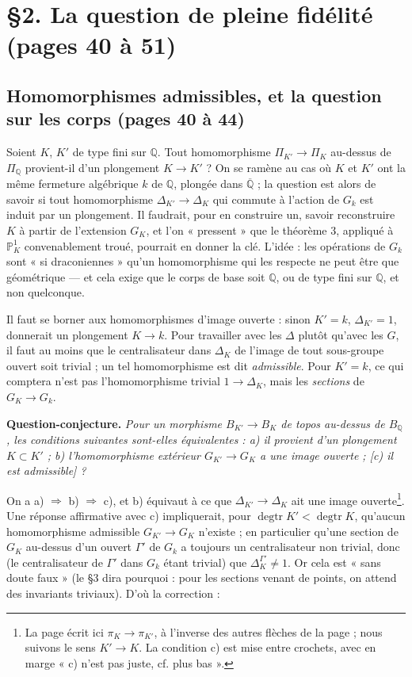 \documentclass[11pt,a4paper]{article}
\begin{document}
\section*{§2. La question de pleine fidélité (pages 40 à 51)}

\subsection*{Homomorphismes admissibles, et la question sur les corps (pages 40 à 44)}

Soient $K$, $K'$ de type fini sur $\mathbb{Q}$. Tout homomorphisme
$\Pi_{K'} \to \Pi_K$ au-dessus de $\Pi_{\mathbb{Q}}$ provient-il d'un
plongement $K \to K'$ ? On se ramène au cas où $K$ et $K'$ ont la même
fermeture algébrique $k$ de $\mathbb{Q}$, plongée dans
$\overline{\mathbb{Q}}$ ; la question est alors de savoir si tout
homomorphisme $\Delta_{K'} \to \Delta_K$ qui commute à l'action de $G_k$ est
induit par un plongement. Il faudrait, pour en construire un, savoir
reconstruire $K$ à partir de l'extension $G_K$, et l'on « pressent » que le
théorème 3, appliqué à $\mathbb{P}^1_K$ convenablement troué, pourrait en
donner la clé. L'idée : les opérations de $G_k$ sont « si draconiennes »
qu'un homomorphisme qui les respecte ne peut être que géométrique — et cela
exige que le corps de base soit $\mathbb{Q}$, ou de type fini sur
$\mathbb{Q}$, et non quelconque.

Il faut se borner aux homomorphismes d'image ouverte : sinon $K' = k$,
$\Delta_{K'} = 1$, donnerait un plongement $K \to k$. Pour travailler avec les
$\Delta$ plutôt qu'avec les $G$, il faut au moins que le centralisateur dans
$\Delta_K$ de l'image de tout sous-groupe ouvert soit trivial ; un tel
homomorphisme est dit \emph{admissible}. Pour $K' = k$, ce qui comptera n'est
pas l'homomorphisme trivial $1 \to \Delta_K$, mais les \emph{sections} de $G_K
\to G_k$.

\textbf{Question-conjecture.} \emph{Pour un morphisme $B_{K'} \to B_K$ de
topos au-dessus de $B_{\mathbb{Q}}$, les conditions suivantes sont-elles
équivalentes : a) il provient d'un plongement $K \subset K'$ ; b)
l'homomorphisme extérieur $G_{K'} \to G_K$ a une image ouverte ; [c) il est
admissible] ?}

On a a) $\Rightarrow$ b) $\Rightarrow$ c), et b) équivaut à ce que $\Delta_{K'}
\to \Delta_K$ ait une image ouverte\footnote{La page écrit ici $\pi_K \to
\pi_{K'}$, à l'inverse des autres flèches de la page ; nous suivons le sens
$K' \to K$. La condition c) est mise entre crochets, avec en marge « c) n'est
pas juste, cf. plus bas ».}. Une réponse affirmative avec c) impliquerait,
pour $\operatorname{degtr} K' < \operatorname{degtr} K$, qu'aucun homomorphisme
admissible $G_{K'} \to G_K$ n'existe ; en particulier qu'une section de $G_K$
au-dessus d'un ouvert $\Gamma'$ de $G_k$ a toujours un centralisateur non
trivial, donc (le centralisateur de $\Gamma'$ dans $G_k$ étant trivial)
que $\Delta_K^{\Gamma'} \ne 1$. Or cela est « sans doute faux » (le §3 dira
pourquoi : pour les sections venant de points, on attend des invariants
triviaux). D'où la correction :
\end{document}
